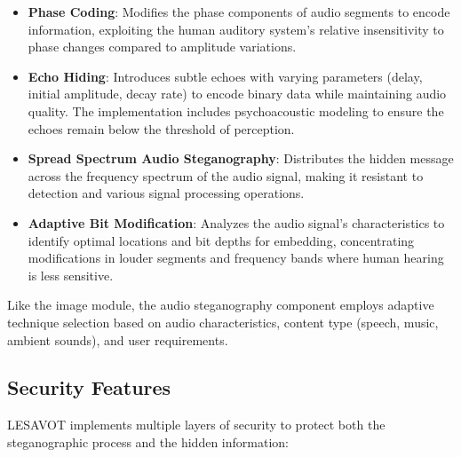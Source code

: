 \documentclass[12pt, a4paper, oneside]{book}
\begin{document}
\begin{itemize}[leftmargin=*]
    \item \textbf{Phase Coding}: Modifies the phase components of audio segments to encode information, exploiting the human auditory system's relative insensitivity to phase changes compared to amplitude variations.

    \item \textbf{Echo Hiding}: Introduces subtle echoes with varying parameters (delay, initial amplitude, decay rate) to encode binary data while maintaining audio quality. The implementation includes psychoacoustic modeling to ensure the echoes remain below the threshold of perception.

    \item \textbf{Spread Spectrum Audio Steganography}: Distributes the hidden message across the frequency spectrum of the audio signal, making it resistant to detection and various signal processing operations.

    \item \textbf{Adaptive Bit Modification}: Analyzes the audio signal's characteristics to identify optimal locations and bit depths for embedding, concentrating modifications in louder segments and frequency bands where human hearing is less sensitive.
\end{itemize}

Like the image module, the audio steganography component employs adaptive technique selection based on audio characteristics, content type (speech, music, ambient sounds), and user requirements.

\subsection{Security Features}
LESAVOT implements multiple layers of security to protect both the steganographic process and the hidden information:
\end{document}
